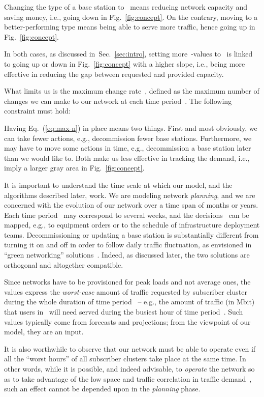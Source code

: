 \documentclass[10pt,journal,cspaper,compsoc]{IEEEtran}
\newcommand{\Fig}[1]{Fig.~\ref{fig:#1}}
\newcommand{\Sec}[1]{Sec.~\ref{sec:#1}}
\newcommand{\Eq}[1]{Eq.~(\ref{eq:#1})}
\begin{document}
Changing the type of a base station to~ means reducing network capacity and saving money, i.e.,
going down in \Fig{concept}. On the contrary, moving to a better-performing type means being able to serve
more traffic, hence going up in \Fig{concept}.

In both cases, as discussed in~\Sec{intro}, setting more~-values to~ is linked to going up or down in \Fig{concept}
with a higher slope, i.e., being more effective in reducing the gap between requested and provided capacity.

What limits us is the maximum change rate~, defined as the maximum number of changes
we can make to our network at each time period~. The following constraint must hold:


Having \Eq{max-n} in place means two things. First and most obviously, we can take fewer actions, e.g., 
decommission fewer base stations. Furthermore, we may have to move some actions in time, e.g., decommission a base 
station later than we would like to. Both make us less effective in tracking the demand, i.e., imply a larger gray 
area in \Fig{concept}.

It is important to understand the time scale at which our model, and the algorithms described later, work. We are
modeling network {\em planning}, and we are concerned with the evolution of our network over a time span of
months or years.
Each time period~ may correspond to several weeks, and the decisions~
can be mapped, e.g., to equipment orders or to the schedule of infrastructure deployment teams.
Decommissioning or updating a base station is substantially different from
turning it on and off in order to follow daily traffic fluctuation, as envisioned in ``green networking''
solutions~\cite{green-ajmone,green-on,peng2011}. Indeed, as discussed later, the two solutions are orthogonal
and altogether compatible.

Since networks have to be provisioned for peak loads and not average ones, the~ values express the
{\em worst-case} amount of traffic requested by subscriber cluster~ during the whole duration of time period~ --
e.g., the amount of traffic (in Mbit) that users in~ will need served during the busiest hour of
time period~. Such values typically come from forecasts and projections; from the viewpoint of our model,
they are an input.

It is also worthwhile to observe that our network must be able to operate even if all the ``worst hours'' of all
subscriber clusters take place at the same time. In other words, while it is possible, and indeed advisable,
to {\em operate} the network so as to take advantage of the low space and traffic correlation in traffic
demand~\cite{difrancesco2014}, such an effect cannot be depended upon in the {\em planning} phase.
\end{document}
